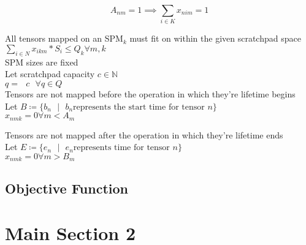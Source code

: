 \[
A_{nm} = 1 \implies \sum_{i \in K} x_{nim} = 1 
\]

All tensors mapped on an SPM$_k$ must fit on within the given scratchpad space\\

$\sum_{i \in N} {x_{ikm} * S_i} \leq Q_k \forall m,k$\\

SPM sizes are fixed\\

Let scratchpad capacity $c \in \mathbb{N}$\\
$q = \text{ }c \text{ }\forall q \in Q$\\

Tensors are not mapped before the operation in which they're lifetime begins \\

Let $B \coloneqq \{ b_n \text{ } | \text{ }  b_n \text{represents the start time for tensor $n$}\}$ \\

$x_{nmk} = 0 \forall m < A_m$

Tensors are not mapped after the operation in which they're lifetime ends \\

Let $E \coloneqq \{ e_n \text{ } | \text{ }  e_n \text{represents time for tensor $n$}\}$ \\

$x_{nmk} = 0 \forall m > B_m$


\subsection{Objective Function}


\section{Main Section 2}

